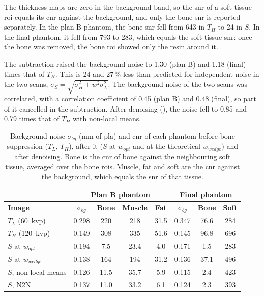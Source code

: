 The thickness maps are zero in the background band, so the \gls{snr} of a soft-tissue \gls{roi} equals its \gls{cnr} against the background, and only the bone \gls{snr} is reported separately. In the plan B phantom, the bone \gls{snr} fell from 643 in $T_H$ to 24 in $S$. In the final phantom, it fell from 793 to 283, which equals the soft-tissue \gls{snr}: once the bone was removed, the bone \gls{roi} showed only the resin around it.

The subtraction raised the background noise to 1.30 (plan B) and 1.18 (final) times that of $T_H$. This is 24 and 27\,\% less than predicted for independent noise in the two scans, $\sigma_S = \sqrt{\sigma_H^2 + w^2\sigma_L^2}$. The background noise of the two scans was correlated, with a correlation coefficient of 0.45 (plan B) and 0.48 (final), so part of it cancelled in the subtraction. After denoising (), the noise fell to 0.85 and 0.79 times that of $T_H$ with non-local means.

\begin{table}[htbp]
    \centering
    \caption{Background noise $\sigma_{bg}$ (mm of \gls{pla}) and \gls{cnr} of each phantom before bone suppression ($T_L$, $T_H$), after it ($S$ at $w_{opt}$ and at the theoretical $w_{wedge}$) and after denoising. Bone is the \gls{cnr} of bone against the neighbouring soft tissue, averaged over the bone \glspl{roi}. Muscle, fat and soft are the \gls{cnr} against the background, which equals the \gls{snr} of that tissue.}
    \label{tab:analysis_cnr}
    \small
    \begin{tabular}{|l|c|c|c|c|c|c|c|}
    \hline
     & \multicolumn{4}{c|}{\textbf{Plan B phantom}} & \multicolumn{3}{c|}{\textbf{Final phantom}}\\
    \hline
    \textbf{Image} & $\sigma_{bg}$ & \textbf{Bone} & \textbf{Muscle} & \textbf{Fat} & $\sigma_{bg}$ & \textbf{Bone} & \textbf{Soft}\\
    \hline
    $T_L$ (60~\gls{kvp})           & 0.298 & 220  & 218  & 31.5 & 0.347 & 76.6 & 284\\
    $T_H$ (120~\gls{kvp})          & 0.149 & 308  & 335  & 51.6 & 0.145 & 96.8 & 696\\
    \hline
    $S$ at $w_{opt}$               & 0.194 & 7.5  & 23.4 & 4.0  & 0.171 & 1.5  & 283\\
    $S$ at $w_{wedge}$             & 0.138 & 164  & 194  & 31.2 & 0.136 & 37.1 & 496\\
    \hline
    $S$, non-local means           & 0.126 & 11.5 & 35.7 & 5.9  & 0.115 & 2.4  & 423\\
    $S$, N2N                       & 0.137 & 11.0 & 33.2 & 6.1  & 0.124 & 2.3  & 393\\
    \hline
    \end{tabular}
\end{table}

